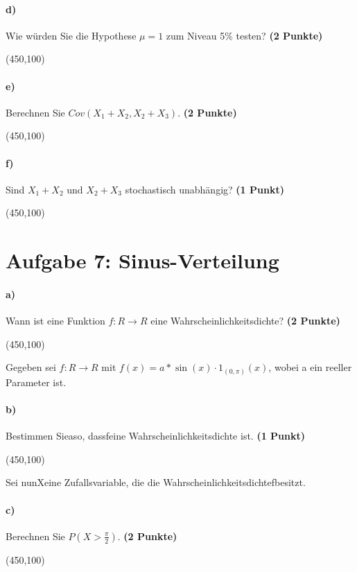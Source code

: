 \documentclass[10pt, a4paper]{article}
\begin{document}
\paragraph{d)} Wie würden Sie die Hypothese $\mu= 1$ zum Niveau 5\% testen? \textbf{(2 Punkte)}
\begin{center}
  \framebox(450,100){}
\end{center}

\paragraph{e)} Berechnen Sie $Cov(X_1+X_2,X_2+X_3)$. \textbf{(2 Punkte)}
\begin{center}
  \framebox(450,100){}
\end{center}

\paragraph{f)} Sind $X_1+X_2$ und $X_2+X_3$ stochastisch unabhängig? \textbf{(1 Punkt)}
\begin{center}
  \framebox(450,100){}
\end{center}

\section{Aufgabe 7: Sinus-Verteilung}
\paragraph{a)} Wann ist eine Funktion $f:R\rightarrow R$ eine Wahrscheinlichkeitsdichte? \textbf{(2 Punkte)}
\begin{center}
  \framebox(450,100){}
\end{center}

Gegeben sei $f:R\rightarrow R$ mit $f(x) =a*\sin(x)·1_{(0,\pi)}(x)$, wobei a ein reeller Parameter ist.
\paragraph{b)} Bestimmen Sieaso, dassfeine Wahrscheinlichkeitsdichte ist. \textbf{(1 Punkt)}
\begin{center}
  \framebox(450,100){}
\end{center}

Sei nunXeine Zufallsvariable, die die Wahrscheinlichkeitsdichtefbesitzt.
\paragraph{c)} Berechnen Sie $P(X >\frac{\pi}{2})$. \textbf{(2 Punkte)}
\begin{center}
  \framebox(450,100){}
\end{center}
\end{document}

